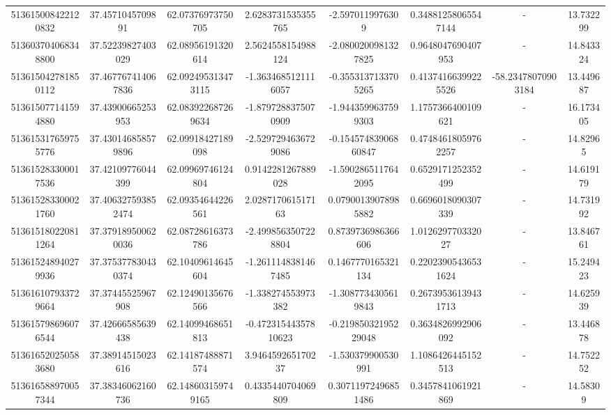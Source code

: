 \documentclass{article}
\begin{document}
\begin{landscape}
\begin{longtable}[c]{S[table-format=18.0]S[table-format=2.15]S[table-format=2.15]S[table-format=-2.17]S[table-format=-2.16]S[table-format=-2.16]S[table-format=-3.16]S[table-format=2.7]}
513615008422120832 & 37.4571045709891   & 62.07376973750705  & 2.6283731535355765    & -2.5970119976309      & 0.34881258065547144 & {-}                  & 13.732299  \\
513603704068348800 & 37.52239827403029  & 62.08956191320614  & 2.5624558154988124    & -2.0800200981327825   & 0.9648047690407953  & {-}                  & 14.843324  \\
513615042781850112 & 37.467767414067836 & 62.092495313473115 & -1.3634685121116057   & -0.3553137133705265   & 0.41374166399225526 & -58.23478070903184  & 13.449687  \\
513615077141594880 & 37.43900665253953  & 62.083922687269634 & -1.8797288375070909   & -1.9443599637599303   & 1.1757366400109621  & {-}                  & 16.173405  \\
513615317659755776 & 37.430146858579896 & 62.09918427189098  & -2.5297294636729086   & -0.15457483906860847  & 0.47484618059762257 & {-}                  & 14.82965   \\
513615283300017536 & 37.42109776044399  & 62.09969746124804  & 0.9142281267889028    & -1.5902865117642095   & 0.6529171252352499  & {-}                  & 14.619179  \\
513615283300021760 & 37.406327593852474 & 62.09354644226561  & 2.028717061517163     & 0.07900139078985882   & 0.6696018090307339  & {-}                  & 14.731992  \\
513615180220811264 & 37.379189500620036 & 62.08728616373786  & -2.4998563507228804   & 0.8739736986366606    & 1.012629770332027   & {-}                  & 13.846761  \\
513615248940279936 & 37.375377830430374 & 62.10409614645604  & -1.2611148381467485   & 0.1467770165321134    & 0.22023905436531624 & {-}                  & 15.249423  \\
513616107933729664 & 37.37445525967908  & 62.12490135676566  & -1.338274553973382    & -1.3087734305619843   & 0.26739536139431713 & {-}                  & 14.625939  \\
513615798696076544 & 37.42666585639438  & 62.14099468651813  & -0.47231544357810623  & -0.21985032195229048  & 0.3634826992906092  & {-}                  & 13.446878  \\
513616520250583680 & 37.38914515023616  & 62.14187488871574  & 3.946459265170237     & -1.530379900530991    & 1.1086426445152513  & {-}                  & 14.752252  \\
513616588970057344 & 37.38346062160736  & 62.148603159749165 & 0.4335440704069809    & 0.30711972496851486   & 0.3457841061921869  & {-}                  & 14.58309   \\

\end{longtable}
\end{landscape}
\end{document}

